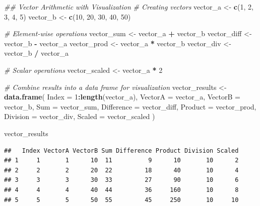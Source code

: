 \documentclass[
]{article}
\newenvironment{Shaded}{\begin{snugshade}}{\end{snugshade}}
\newcommand{\CommentTok}[1]{\textcolor[rgb]{0.56,0.35,0.01}{\textit{#1}}}
\newcommand{\DataTypeTok}[1]{\textcolor[rgb]{0.13,0.29,0.53}{#1}}
\newcommand{\DecValTok}[1]{\textcolor[rgb]{0.00,0.00,0.81}{#1}}
\newcommand{\KeywordTok}[1]{\textcolor[rgb]{0.13,0.29,0.53}{\textbf{#1}}}
\newcommand{\NormalTok}[1]{#1}
\newcommand{\OperatorTok}[1]{\textcolor[rgb]{0.81,0.36,0.00}{\textbf{#1}}}
\newcommand{\StringTok}[1]{\textcolor[rgb]{0.31,0.60,0.02}{#1}}
\begin{document}
\begin{Shaded}
\begin{Highlighting}[]
\CommentTok{## Vector Arithmetic with Visualization}
\CommentTok{# Creating vectors}
\NormalTok{vector_a <-}\StringTok{ }\KeywordTok{c}\NormalTok{(}\DecValTok{1}\NormalTok{, }\DecValTok{2}\NormalTok{, }\DecValTok{3}\NormalTok{, }\DecValTok{4}\NormalTok{, }\DecValTok{5}\NormalTok{)}
\NormalTok{vector_b <-}\StringTok{ }\KeywordTok{c}\NormalTok{(}\DecValTok{10}\NormalTok{, }\DecValTok{20}\NormalTok{, }\DecValTok{30}\NormalTok{, }\DecValTok{40}\NormalTok{, }\DecValTok{50}\NormalTok{)}

\CommentTok{# Element-wise operations}
\NormalTok{vector_sum <-}\StringTok{ }\NormalTok{vector_a }\OperatorTok{+}\StringTok{ }\NormalTok{vector_b}
\NormalTok{vector_diff <-}\StringTok{ }\NormalTok{vector_b }\OperatorTok{-}\StringTok{ }\NormalTok{vector_a}
\NormalTok{vector_prod <-}\StringTok{ }\NormalTok{vector_a }\OperatorTok{*}\StringTok{ }\NormalTok{vector_b}
\NormalTok{vector_div <-}\StringTok{ }\NormalTok{vector_b }\OperatorTok{/}\StringTok{ }\NormalTok{vector_a}

\CommentTok{# Scalar operations}
\NormalTok{vector_scaled <-}\StringTok{ }\NormalTok{vector_a }\OperatorTok{*}\StringTok{ }\DecValTok{2}

\CommentTok{# Combine results into a data frame for visualization}
\NormalTok{vector_results <-}\StringTok{ }\KeywordTok{data.frame}\NormalTok{(}
  \DataTypeTok{Index =} \DecValTok{1}\OperatorTok{:}\KeywordTok{length}\NormalTok{(vector_a),}
  \DataTypeTok{VectorA =}\NormalTok{ vector_a,}
  \DataTypeTok{VectorB =}\NormalTok{ vector_b,}
  \DataTypeTok{Sum =}\NormalTok{ vector_sum,}
  \DataTypeTok{Difference =}\NormalTok{ vector_diff,}
  \DataTypeTok{Product =}\NormalTok{ vector_prod,}
  \DataTypeTok{Division =}\NormalTok{ vector_div,}
  \DataTypeTok{Scaled =}\NormalTok{ vector_scaled}
\NormalTok{)}

\NormalTok{vector_results}
\end{Highlighting}
\end{Shaded}

\begin{verbatim}
##   Index VectorA VectorB Sum Difference Product Division Scaled
## 1     1       1      10  11          9      10       10      2
## 2     2       2      20  22         18      40       10      4
## 3     3       3      30  33         27      90       10      6
## 4     4       4      40  44         36     160       10      8
## 5     5       5      50  55         45     250       10     10
\end{verbatim}
\end{document}
